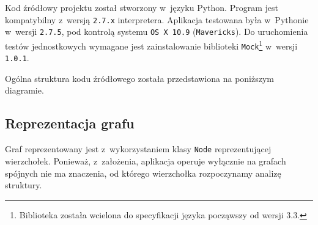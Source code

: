 \documentclass[a4paper,10pt]{article}
\begin{document}
Kod źródłowy projektu został stworzony w~języku Python. Program jest kompatybilny z~wersją \verb+2.7.x+ interpretera. Aplikacja testowana była w~Pythonie w~wersji \verb+2.7.5+, pod kontrolą systemu \verb+OS X 10.9+ (\verb+Mavericks+). Do uruchomienia testów jednostkowych wymagane jest zainstalowanie biblioteki \verb+Mock+\footnote{Biblioteka została wcielona do specyfikacji języka począwszy od wersji 3.3.} w~wersji \verb+1.0.1+.

Ogólna struktura kodu źródłowego została przedstawiona na poniższym diagramie.

 
\subsection*{Reprezentacja grafu}

Graf reprezentowany jest z~wykorzystaniem klasy \verb+Node+ reprezentującej wierzchołek. Ponieważ, z~założenia, aplikacja operuje wyłącznie na grafach spójnych nie ma znaczenia, od którego wierzchołka rozpoczynamy analizę struktury.
\end{document}
